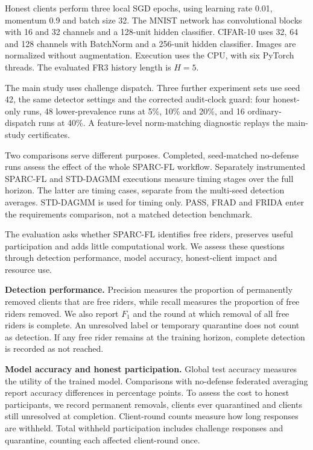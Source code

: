\documentclass[journal]{IEEEtran}
\makeatletter
\renewcommand{\subsection}{\@startsection{subsection}{2}{\z@}{1.5ex}{0.7ex}{\normalfont\normalsize\itshape}}
\makeatother
\begin{document}
Honest clients perform three local SGD epochs, using learning rate 0.01,
momentum 0.9 and batch size 32. The MNIST network has convolutional blocks
with 16 and 32 channels and a 128-unit hidden classifier. CIFAR-10 uses
32, 64 and 128 channels with BatchNorm and a 256-unit hidden classifier.
Images are normalized without augmentation. Execution uses the CPU, with
six PyTorch threads. The evaluated FR3 history length is $H=5$.

The main study uses challenge dispatch. Three further experiment sets use
seed 42, the same detector settings and the corrected audit-clock guard:
four honest-only runs, 48 lower-prevalence runs at 5\%, 10\% and 20\%,
and 16 ordinary-dispatch runs at 40\%. A feature-level norm-matching
diagnostic replays the main-study certificates.

Two comparisons serve different purposes. Completed, seed-matched
no-defense runs assess the effect of the whole SPARC-FL workflow.
Separately instrumented SPARC-FL and STD-DAGMM executions measure timing
stages over the full horizon. The latter are timing cases, separate from
the multi-seed detection averages.
STD-DAGMM is used for timing only. PASS, FRAD and FRIDA enter the
requirements comparison, not a matched detection benchmark.


\subsection{Evaluation Metrics}
The evaluation asks whether SPARC-FL identifies free riders, preserves
useful participation and adds little computational work. We assess these
questions through detection performance, model accuracy, honest-client
impact and resource use.

\textbf{Detection performance.} Precision measures the proportion of
permanently removed clients that are free riders, while recall measures
the proportion of free riders removed. We also report $F_1$ and the round at which removal
of all free riders is complete. An unresolved label or temporary quarantine
does not count as detection. If any free rider remains at the training
horizon, complete detection is recorded as not reached.

\textbf{Model accuracy and honest participation.} Global test accuracy
measures the utility of the trained model. Comparisons with no-defense
federated averaging report accuracy differences in percentage points.
To assess the cost to honest participants, we record permanent removals,
clients ever quarantined and clients still unresolved at completion.
Client-round counts measure how long responses are withheld. Total
withheld participation includes challenge responses and quarantine, counting
each affected client-round once.
\end{document}
